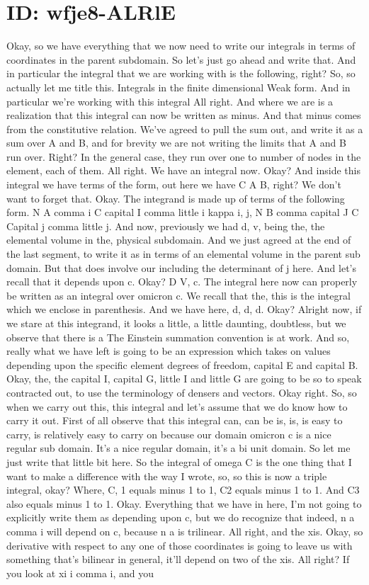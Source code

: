 \documentclass[10pt]{article}
\begin{document}
\section*{ID: wfje8-ALRlE}
Okay, so we have everything that we now need to write our integrals in terms of coordinates in the parent subdomain. So let's just go ahead and write that. And in particular the integral that we are working with is the following, right? So, so actually let me title this. Integrals in the finite dimensional Weak form. And in particular we're working with this integral All right. And where we are is a realization that this integral can now be written as minus. And that minus comes from the constitutive relation. We've agreed to pull the sum out, and write it as a sum over A and B, and for brevity we are not writing the limits that A and B run over. Right? In the general case, they run over one to number of nodes in the element, each of them. All right. We have an integral now. Okay? And inside this integral we have terms of the form, out here we have C A B, right? We don't want to forget that. Okay. The integrand is made up of terms of the following form. N A comma i C capital I comma little i kappa i, j, N B comma capital J C Capital j comma little j. And now, previously we had d, v, being the, the elemental volume in the, physical subdomain. And we just agreed at the end of the last segment, to write it as in terms of an elemental volume in the parent sub domain. But that does involve our including the determinant of j here. And let's recall that it depends upon c. Okay? D V, c. The integral here now can properly be written as an integral over omicron c. We recall that the, this is the integral which we enclose in parenthesis. And we have here, d, d, d. Okay? Alright now, if we stare at this integrand, it looks a little, a little daunting, doubtless, but we observe that there is a The Einstein summation convention is at work. And so, really what we have left is going to be an expression which takes on values depending upon the specific element degrees of freedom, capital E and capital B. Okay, the, the capital I, capital G, little I and little G are going to be so to speak contracted out, to use the terminology of densers and vectors. Okay right. So, so when we carry out this, this integral and let's assume that we do know how to carry it out. First of all observe that this integral can, can be is, is, is easy to carry, is relatively easy to carry on because our domain omicron c is a nice regular sub domain. It's a nice regular domain, it's a bi unit domain. So let me just write that little bit here. So the integral of omega C is the one thing that I want to make a difference with the way I wrote, so, so this is now a triple integral, okay? Where, C, 1 equals minus 1 to 1, C2 equals minus 1 to 1. And C3 also equals minus 1 to 1. Okay. Everything that we have in here, I'm not going to explicitly write them as depending upon c, but we do recognize that indeed, n a comma i will depend on c, because n a is trilinear. All right, and the xis. Okay, so derivative with respect to any one of those coordinates is going to leave us with something that's bilinear in general, it'll depend on two of the xis. All right? If you look at xi i comma i, and you 
\end{document}
